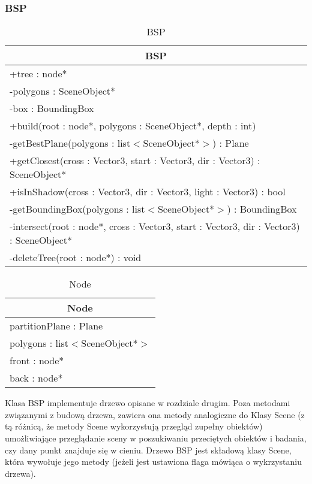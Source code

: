 \subsubsection{BSP}

\footnotesize
\begin{longtable}{|p{14cm}|}
	\caption{BSP} \label{tab:BSP} \\ \hline
	\multicolumn{1}{|c|}{BSP} \\ \hline
    +tree : node* \\
    -polygons : SceneObject* \\
    -box : BoundingBox \\ \hline
    +build(root : node*, polygons : SceneObject*, depth : int) \\ 
	-getBestPlane(polygons : list$<$SceneObject*$>$) : Plane \\
	+getClosest(cross : Vector3, start : Vector3, dir : Vector3) : SceneObject* \\
	+isInShadow(cross : Vector3, dir : Vector3, light : Vector3) : bool \\
	-getBoundingBox(polygons : list$<$SceneObject*$>$) : BoundingBox \\
	-intersect(root : node*, cross : Vector3, start : Vector3, dir : Vector3) : SceneObject* \\
	-deleteTree(root : node*) : void \\
    \hline
\end{longtable}
\normalsize

\footnotesize
\begin{longtable}{|p{14cm}|}
    \caption{Node} \label{tab:Node (struktura)} \\ \hline
    \multicolumn{1}{|c|}{Node} \\ \hline
    partitionPlane : Plane \\
    polygons : list$<$SceneObject*$>$ \\
    front : node*  \\
    back : node*  \\ \hline
\end{longtable}
\normalsize

Klasa BSP implementuje drzewo opisane w rozdziale drugim. Poza metodami związanymi z budową drzewa, zawiera ona metody analogiczne do Klasy Scene (z tą różnicą, że metody Scene wykorzystują przegląd zupełny obiektów) umożliwiające przeglądanie sceny w poszukiwaniu przeciętych obiektów i badania, czy dany punkt znajduje się w cieniu. Drzewo BSP jest składową klasy Scene, która wywołuje jego metody (jeżeli jest ustawiona flaga mówiąca o wykrzystaniu drzewa).

